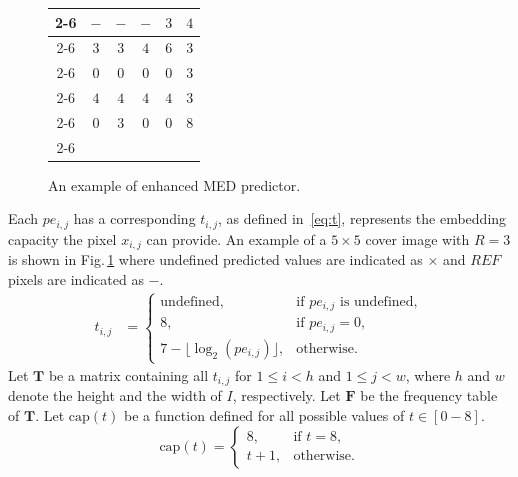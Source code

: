 \documentclass{elsarticle}
\begin{document}
\begin{figure}[!t]
\begin{tabular}{c|c|c|c|c|c|}
			\cline{2-6}
			\multirow{5}{*}{Embedding capacity}
			&\(-\) 		& \(-\) 	 & \(-\)	  & \(3\) & \(4\)  \\ \cline{2-6}
			&\(3\)      & \(3\)      & \(4\)      & \(6\) & \(3\)  \\ \cline{2-6}
			&\(0\)      & \(0\)      & \(0\)      & \(0\) & \(3\)  \\ \cline{2-6}
			&\(4\)      & \(4\)      & \(4\)      & \(4\) & \(3\)  \\ \cline{2-6} 
			&\(0\)      & \(3\)      & \(0\)      & \(0\) & \(8\)  \\ \cline{2-6}
			
		\end{tabular}
		\caption{An example of enhanced MED predictor.}
		\label{fig:xpv}
	\end{figure}
	
	Each \(pe_{i, j}\) has a corresponding \(t_{i, j}\), as defined in~\eqref{eq:t}, represents the embedding capacity the pixel \(x_{i, j}\) can provide.
	An example of a \(5 \times 5\) cover image with \(R = 3\) is shown in Fig.\,\ref{fig:xpv} where undefined predicted values are indicated as \(\times\) and \(REF\) pixels are indicated as \(-\).
	\begin{align}
		\label{eq:t}
		t_{i, j} &= 
		\begin{cases}
			\text{undefined},             & \text{if } pe_{i, j} \text{ is undefined} ,\\
			8,&  \text{if } pe_{i, j} = 0,       \\
			7 - \lfloor \log_2(pe_{i, j}) \rfloor ,&  \text{otherwise.}
		\end{cases}  	
	\end{align}
	Let \(\mathbf{T}\) be a matrix containing all \(t_{i, j}\) for \(1 \leq i < h\) and \(1\leq j < w\), where \(h\) and \(w\) denote the height and the width of \(I\), respectively.
	Let \(\mathbf{F}\) be the frequency table of \(\mathbf{T}\).
	Let \(\mathrm{cap}(t)\) be a function defined for all possible values of \(t \in [0-8]\).
	\begin{equation}
		\label{eq:cap}
		\mathrm{cap}(t) = 
		\begin{cases}
			8     ,&  \text{if } t = 8,       \\
			t + 1 ,&  \text{otherwise}.
		\end{cases} 
	\end{equation}
	
\end{document}
